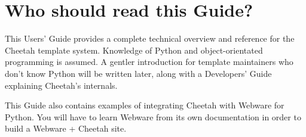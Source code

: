 \section{Who should read this Guide?}

This Users' Guide provides a complete technical overview and reference for the
Cheetah template system.  Knowledge of Python and object-orientated programming
is assumed.  A gentler introduction for template maintainers who don't know
Python will be written later, along with a Developers' Guide explaining
Cheetah's internals.

This Guide also contains examples of integrating Cheetah with Webware for
Python.  You will have to learn Webware from its own documentation in order to
build a Webware + Cheetah site.

